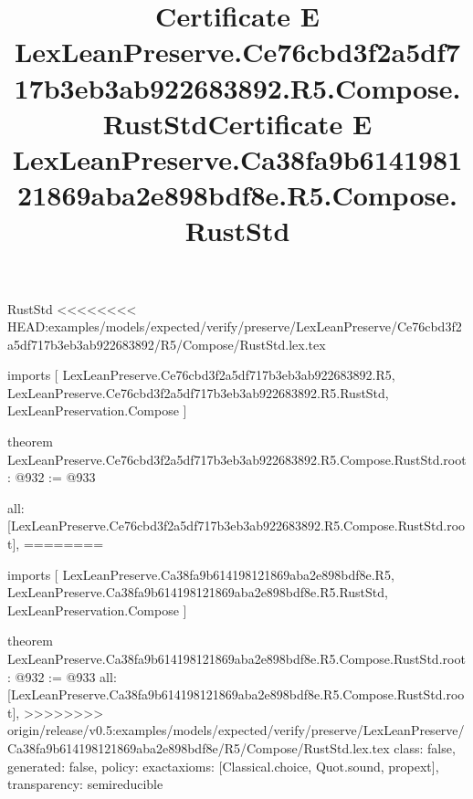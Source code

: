 \begin{lexlean}{RustStd}
<<<<<<<< HEAD:examples/models/expected/verify/preserve/LexLeanPreserve/Ce76cbd3f2a5df717b3eb3ab922683892/R5/Compose/RustStd.lex.tex
\title{Certificate E LexLeanPreserve.Ce76cbd3f2a5df717b3eb3ab922683892.R5.Compose.RustStd}
\begin{coremodule}
imports [
  LexLeanPreserve.Ce76cbd3f2a5df717b3eb3ab922683892.R5,
  LexLeanPreserve.Ce76cbd3f2a5df717b3eb3ab922683892.R5.RustStd,
  LexLeanPreservation.Compose
]

theorem LexLeanPreserve.Ce76cbd3f2a5df717b3eb3ab922683892.R5.Compose.RustStd.root : @932 := @933 {
  all: [LexLeanPreserve.Ce76cbd3f2a5df717b3eb3ab922683892.R5.Compose.RustStd.root],
========
\title{Certificate E LexLeanPreserve.Ca38fa9b614198121869aba2e898bdf8e.R5.Compose.RustStd}
\begin{coremodule}
imports [
  LexLeanPreserve.Ca38fa9b614198121869aba2e898bdf8e.R5,
  LexLeanPreserve.Ca38fa9b614198121869aba2e898bdf8e.R5.RustStd,
  LexLeanPreservation.Compose
]

theorem LexLeanPreserve.Ca38fa9b614198121869aba2e898bdf8e.R5.Compose.RustStd.root : @932 := @933 {
  all: [LexLeanPreserve.Ca38fa9b614198121869aba2e898bdf8e.R5.Compose.RustStd.root],
>>>>>>>> origin/release/v0.5:examples/models/expected/verify/preserve/LexLeanPreserve/Ca38fa9b614198121869aba2e898bdf8e/R5/Compose/RustStd.lex.tex
  class: false,
  generated: false,
  policy: exact{axioms: [Classical.choice, Quot.sound, propext]},
  transparency: semireducible
}


\end{coremodule}}
\end{coremodule}
\end{lexlean}
